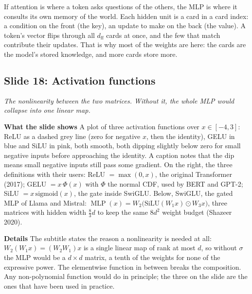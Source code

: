 \documentclass[11pt,letterpaper]{article}
\newcommand{\slide}[3]{%
  \subsection[Slide #1: #2]{Slide #1: #2}%
  {\color{muted}\itshape #3\par}\medskip}
\newcommand{\para}[1]{\medskip\noindent\textbf{#1}\quad}
\newenvironment{intuition}{\begin{tcolorbox}[intuitionbox]}{\end{tcolorbox}}
\newcommand{\dff}{d_{\mathrm{ff}}}
\DeclareMathOperator{\MLP}{MLP}
\begin{document}
\begin{intuition}
If attention is where a token asks questions of the others, the MLP is where it consults its own memory of the world. Each hidden unit is a card in a card index: a condition on the front (the key), an update to make on the back (the value). A token's vector flips through all $\dff$ cards at once, and the few that match contribute their updates. That is why most of the weights are here: the cards are the model's stored knowledge, and more cards store more.
\end{intuition}

\slide{18}{Activation functions}{The nonlinearity between the two matrices. Without it, the whole MLP would collapse into one linear map.}

\para{What the slide shows} A plot of three activation functions over $x\in[-4,3]$: ReLU as a dashed grey line (zero for negative $x$, then the identity), GELU in blue and SiLU in pink, both smooth, both dipping slightly below zero for small negative inputs before approaching the identity. A caption notes that the dip means small negative inputs still pass some gradient. On the right, the three definitions with their users: ReLU $=\max(0,x)$, the original Transformer (2017); GELU $=x\,\Phi(x)$ with $\Phi$ the normal CDF, used by BERT and GPT-2; SiLU $=x\,\mathrm{sigmoid}(x)$, the gate inside SwiGLU. Below, SwiGLU, the gated MLP of Llama and Mistral: $\MLP(x)=W_2\big(\mathrm{SiLU}(W_1x)\odot W_3x\big)$, three matrices with hidden width $\tfrac83d$ to keep the same $8d^2$ weight budget (Shazeer 2020).

\para{Details} The subtitle states the reason a nonlinearity is needed at all: $W_2(W_1x)=(W_2W_1)x$ is a single linear map of rank at most $d$, so without $\sigma$ the MLP would be a $d\times d$ matrix, a tenth of the weights for none of the expressive power. The elementwise function in between breaks the composition. Any non-polynomial function would do in principle; the three on the slide are the ones that have been used in practice.
\end{document}
